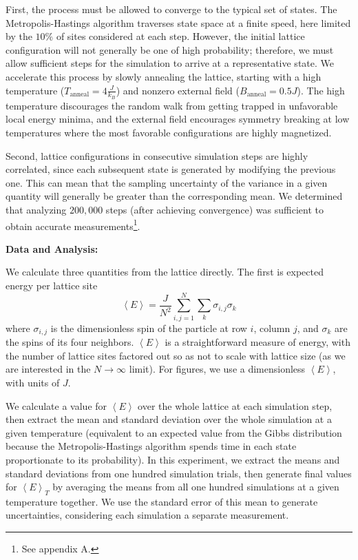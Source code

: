 \documentclass[letter,scriptaddress,twocolumn, prl,nofootinbib]{revtex4}
\newcommand{\submin}[1]{\left\langle #1 \right\rangle}
\begin{document}
First, the process must be allowed to converge to the typical set of states. The Metropolis-Hastings algorithm traverses state space at a finite speed, here limited by the $10\%$ of sites considered at each step. However, the initial lattice configuration will not generally be one of high probability; therefore, we must allow sufficient steps for the simulation to arrive at a representative state. We accelerate this process by slowly annealing the lattice, starting with a high temperature ($T_\text{anneal} = 4 \frac{J}{k_B}$) and nonzero external field ($B_\text{anneal} = 0.5 J$). The high temperature discourages the random walk from getting trapped in unfavorable local energy minima, and the external field encourages symmetry breaking at low temperatures where the most favorable configurations are highly magnetized.

Second, lattice configurations in consecutive simulation steps are highly correlated, since each subsequent state is generated by modifying the previous one. This can mean that the sampling uncertainty of the variance in a given quantity will generally be greater than the corresponding mean. We determined that analyzing $200,000$ steps (after achieving convergence) was sufficient to obtain accurate measurements\footnote{See appendix A.}.

\textbf{Data and Analysis:}

We calculate three quantities from the lattice directly. The first is expected energy per lattice site
\begin{equation}
	\label{eq:e_average}
	\submin{E} = \frac{J}{N^2}\sum_{i, j = 1}^{N} \sum_{k} \sigma_{i, j} \sigma_k
\end{equation}
where $\sigma_{i, j}$ is the dimensionless spin of the particle at row $i$, column $j$, and $\sigma_k$ are the spins of its four neighbors. $\submin{E}$ is a straightforward measure of energy, with the number of lattice sites factored out so as not to scale with lattice size (as we are interested in the $N\rightarrow\infty$ limit). For figures, we use a dimensionless $\submin{E}$, with units of $J$.

We calculate a value for $\submin{E}$ over the whole lattice at each simulation step, then extract the mean and standard deviation over the whole simulation at a given temperature (equivalent to an expected value from the Gibbs distribution because the Metropolis-Hastings algorithm spends time in each state proportionate to its probability). In this experiment, we extract the means and standard deviations from one hundred simulation trials, then generate final values for $\submin{E}_T$ by averaging the means from all one hundred simulations at a given temperature together. We use the standard error of this mean to generate uncertainties, considering each simulation a separate measurement.
\end{document}
